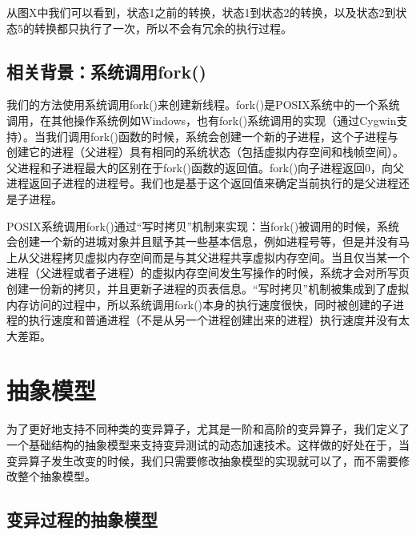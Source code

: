 \documentclass[nofonts]{ctexrep}
\begin{document}
从图X中我们可以看到，状态1之前的转换，状态1到状态2的转换，以及状态2到状态5的转换都只执行了一次，所以不会有冗余的执行过程。


\subsection{相关背景：系统调用fork()}
我们的方法使用系统调用fork()来创建新线程。fork()是POSIX系统中的一个系统调用，在其他操作系统例如Windows，也有fork()系统调用的实现（通过Cygwin支持）。当我们调用fork()函数的时候，系统会创建一个新的子进程，这个子进程与创建它的进程（父进程）具有相同的系统状态（包括虚拟内存空间和栈帧空间）。父进程和子进程最大的区别在于fork()函数的返回值。fork()向子进程返回0，向父进程返回子进程的进程号。我们也是基于这个返回值来确定当前执行的是父进程还是子进程。

POSIX系统调用fork()通过``写时拷贝''机制来实现：当fork()被调用的时候，系统会创建一个新的进城对象并且赋予其一些基本信息，例如进程号等，但是并没有马上从父进程拷贝虚拟内存空间而是与其父进程共享虚拟内存空间。当且仅当某一个进程（父进程或者子进程）的虚拟内存空间发生写操作的时候，系统才会对所写页创建一份新的拷贝，并且更新子进程的页表信息。``写时拷贝''机制被集成到了虚拟内存访问的过程中，所以系统调用fork()本身的执行速度很快，同时被创建的子进程的执行速度和普通进程（不是从另一个进程创建出来的进程）执行速度并没有太大差距。

\section{抽象模型}
\newcommand{\mids}{\ensuremath{I}\xspace}
\newcommand{\execute}{\ensuremath{\mathrm{execute}}\xspace}
\newcommand{\try}{\ensuremath{\mathtt{try}}\xspace}
\newcommand{\apply}{\ensuremath{\mathtt{apply}}\xspace}
\newcommand{\filterv}{\ensuremath{\mathrm{filter\_variants}}\xspace}
\newcommand{\filterm}{\ensuremath{\mathrm{filter\_mutants}}\xspace}
\newcommand{\filterom}{\ensuremath{\mathrm{filter\_out\_mutants}}\xspace}
\newcommand{\VectorSet}{{\tt VectorSet}\xspace}
\newcommand{\ListSet}{{\tt ListSet}\xspace}
\newcommand{\DefaultSet}{{\tt DefaultSet}\xspace}
为了更好地支持不同种类的变异算子，尤其是一阶和高阶的变异算子，我们定义了一个基础结构的抽象模型来支持变异测试的动态加速技术。这样做的好处在于，当变异算子发生改变的时候，我们只需要修改抽象模型的实现就可以了，而不需要修改整个抽象模型。

\subsection{变异过程的抽象模型}
\end{document}
